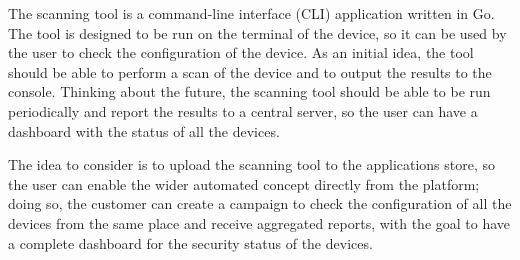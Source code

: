 The scanning tool is a command-line interface (CLI) application written in Go. The tool is designed to be run on the terminal of the device, so it can be used by the user to check the configuration of the device. As an initial idea, the tool should be able to perform a scan of the device and to output the results to the console. Thinking about the future, the scanning tool should be able to be run periodically and report the results to a central server, so the user can have a dashboard with the status of all the devices.

The idea to consider is to upload the scanning tool to the applications store, so the user can enable the wider automated concept directly from the platform; doing so, the customer can create a campaign to check the configuration of all the devices from the same place and receive aggregated reports, with the goal to have a complete dashboard for the security status of the devices.
